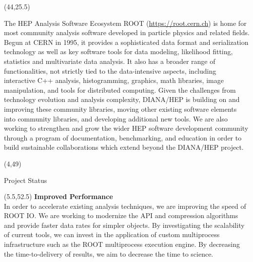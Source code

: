 \documentclass[final]{beamer}
\begin{document}
\begin{frame}{}
\begin{textblock}{38.0}(44,25.5)
\begin{block}{The HEP Analysis Software Ecosystem}
ROOT (\href{https://root.cern.ch}{https://root.cern.ch}) is
home for most community analysis
software developed in particle physics and related fields. Begun at CERN in 1995,
it provides a sophisticated data format and serialization technology
as well as key software tools for
data modeling, likelihood fitting, statistics and
multivariate data analysis. It also has a broader range of
functionalities, not strictly tied to the data-intensive aspects,
including interactive C++ analysis, histogramming,
graphics, math libraries, image manipulation,
and tools for distributed computing.
Given the challenges from technology evolution and analysis complexity,
DIANA/HEP is building on and improving these
community libraries, moving other existing software elements into
community libraries, and developing additional new tools. 
We are also working to strengthen and grow the wider HEP software 
development community through a program of documentation, benchmarking,
and education in order to build sustainable collaborations which 
extend beyond the DIANA/HEP project.
\end{block}
\end{textblock}





\begin{textblock}{78.0}(4,49)
\begin{block}{Project Status}
\end{block}
\end{textblock}

\begin{textblock}{22.5}(5.5,52.5)
\textcolor{mybluelabel}{\bf Improved Performance} \\
In order to accelerate existing analysis techniques, we are improving the speed of ROOT IO.
We are working to modernize the API and compression algorithms
and provide faster data rates for simpler objects.
By investigating the scalability of current tools, 
we can invest in the application of custom multiprocess infrastructure 
such as the ROOT multiprocess execution engine.
By decreasing the time-to-delivery of results, we aim to decrease the time to science.
\end{textblock}


\end{frame}
\end{document}
